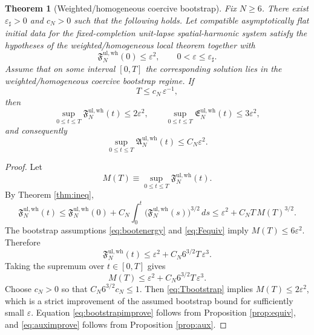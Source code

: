 \documentclass[11pt]{article}
\newtheorem{theorem}{Theorem}
\begin{document}
\begin{theorem}[Weighted/homogeneous coercive bootstrap]
\label{thm:bootstrap}
Fix \(N\ge 6\). There exist \(\varepsilon_\sharp>0\) and \(c_N>0\) such that the following holds. Let compatible asymptotically flat initial data for the fixed-completion unit-lapse spatial-harmonic system satisfy the hypotheses of the weighted/homogeneous local theorem together with
\begin{equation}
\mathfrak F_N^{\mathrm{ul,wh}}(0)\le \varepsilon^2,
\qquad
0<\varepsilon\le \varepsilon_\sharp.
\label{eq:initsmall}
\end{equation}
Assume that on some interval \([0,T]\) the corresponding solution lies in the weighted/homogeneous coercive bootstrap regime. If
\begin{equation}
T\le c_N\,\varepsilon^{-1},
\label{eq:Tbootstrap}
\end{equation}
then
\begin{equation}
\sup_{0\le t\le T}\mathfrak F_N^{\mathrm{ul,wh}}(t)\le 2\varepsilon^2,
\qquad
\sup_{0\le t\le T}\mathfrak E_N^{\mathrm{ul,wh}}(t)\le 3\varepsilon^2,
\label{eq:bootstrapimprove}
\end{equation}
and consequently
\begin{equation}
\sup_{0\le t\le T}\mathfrak A_N^{\mathrm{ul,wh}}(t)\le C_N\varepsilon^2.
\label{eq:auximprove}
\end{equation}
\end{theorem}

\begin{proof}
Let
\[
M(T)\equiv \sup_{0\le t\le T}\mathfrak F_N^{\mathrm{ul,wh}}(t).
\]
By Theorem \ref{thm:ineq},
\[
\mathfrak F_N^{\mathrm{ul,wh}}(t)
\le
\mathfrak F_N^{\mathrm{ul,wh}}(0)
+ C_N\int_0^t
\bigl(\mathfrak F_N^{\mathrm{ul,wh}}(s)\bigr)^{3/2}\,ds
\le
\varepsilon^2 + C_N T\,M(T)^{3/2}.
\]
The bootstrap assumptions \eqref{eq:bootenergy} and \eqref{eq:Fequiv} imply \(M(T)\le 6\varepsilon^2\). Therefore
\[
\mathfrak F_N^{\mathrm{ul,wh}}(t)
\le
\varepsilon^2 + C_N 6^{3/2}T\,\varepsilon^3.
\]
Taking the supremum over \(t\in[0,T]\) gives
\[
M(T)\le \varepsilon^2 + C_N 6^{3/2}T\,\varepsilon^3.
\]
Choose \(c_N>0\) so that \(C_N 6^{3/2} c_N\le 1\). Then \eqref{eq:Tbootstrap} implies \(M(T)\le 2\varepsilon^2\), which is a strict improvement of the assumed bootstrap bound for sufficiently small \(\varepsilon\). Equation \eqref{eq:bootstrapimprove} follows from Proposition \ref{prop:equiv}, and \eqref{eq:auximprove} follows from Proposition \ref{prop:aux}.
\end{proof}
\end{document}
